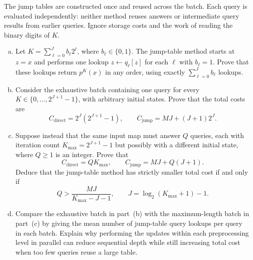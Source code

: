 \begin{exercisechunk}
The jump tables are constructed once and reused across the batch.
Each query is evaluated independently: neither method reuses answers or
intermediate query results from earlier queries. Ignore storage costs and
the work of reading the binary digits of $K$.
\begin{enumerate}[(a),beginpenalty=10000]
\item Let $K=\sum_{\ell=0}^J b_\ell2^\ell$, where
$b_\ell\in\{0,1\}$. The jump-table method starts at $z=x$ and performs
one lookup $z\leftarrow q_\ell[z]$ for each $\ell$ with $b_\ell=1$.
Prove that these lookups return $p^K(x)$ in any order, using exactly
$\sum_{\ell=0}^J b_\ell$ lookups.
\item Consider the exhaustive batch containing one query for every
$K\in\{0,\ldots,2^{J+1}-1\}$, with arbitrary initial states.
Prove that the total costs are
\[
 C_{\mathrm{direct}}=2^J(2^{J+1}-1),
 \qquad
 C_{\mathrm{jump}}=MJ+(J+1)2^J.
\]
\item Suppose instead that the same input map must answer $Q$ queries, each
with iteration count
$K_{\max}=2^{J+1}-1$ but possibly with a different initial state, where
$Q\ge1$ is an integer. Prove that
\[
 C_{\mathrm{direct}}=QK_{\max},
 \qquad C_{\mathrm{jump}}=MJ+Q(J+1).
\]
Deduce that the jump-table method has strictly smaller total cost if and
only if
\[
 Q>\frac{MJ}{K_{\max}-J-1},
 \qquad J=\log_2(K_{\max}+1)-1.
\]
\item Compare the exhaustive batch in part~(b) with the maximum-length batch
in part~(c) by giving the mean number of jump-table query lookups per
query in each batch. Explain why performing the updates within each
preprocessing level in parallel can reduce sequential depth while still increasing total cost
when too few queries reuse a large table.
\end{enumerate}
\end{exercisechunk}
